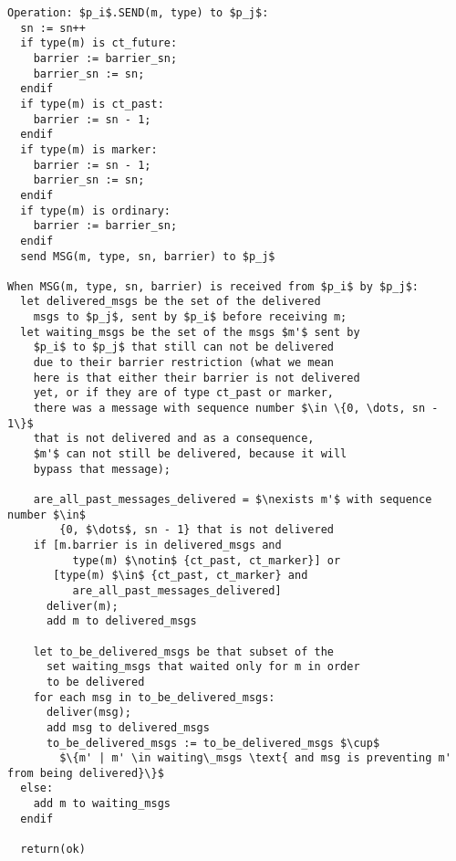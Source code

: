 \documentclass[12pt]{article}
\theoremstyle{plain}
\begin{document}
\clearpage

\begin{lstlisting}[frame=single]
Operation: $p_i$.SEND(m, type) to $p_j$:
  sn := sn++
  if type(m) is ct_future:
    barrier := barrier_sn;
    barrier_sn := sn;
  endif
  if type(m) is ct_past:
    barrier := sn - 1;
  endif
  if type(m) is marker:
    barrier := sn - 1;
    barrier_sn := sn;
  endif
  if type(m) is ordinary:
    barrier := barrier_sn;
  endif
  send MSG(m, type, sn, barrier) to $p_j$

When MSG(m, type, sn, barrier) is received from $p_i$ by $p_j$:
  let delivered_msgs be the set of the delivered 
    msgs to $p_j$, sent by $p_i$ before receiving m;
  let waiting_msgs be the set of the msgs $m'$ sent by
    $p_i$ to $p_j$ that still can not be delivered
    due to their barrier restriction (what we mean
    here is that either their barrier is not delivered
    yet, or if they are of type ct_past or marker,
    there was a message with sequence number $\in \{0, \dots, sn - 1\}$
    that is not delivered and as a consequence, 
    $m'$ can not still be delivered, because it will 
    bypass that message);
    
    are_all_past_messages_delivered = $\nexists m'$ with sequence number $\in$ 
        {0, $\dots$, sn - 1} that is not delivered
    if [m.barrier is in delivered_msgs and
          type(m) $\notin$ {ct_past, ct_marker}] or
       [type(m) $\in$ {ct_past, ct_marker} and
          are_all_past_messages_delivered]
      deliver(m);
      add m to delivered_msgs

    let to_be_delivered_msgs be that subset of the
      set waiting_msgs that waited only for m in order
      to be delivered 
    for each msg in to_be_delivered_msgs:
      deliver(msg);
      add msg to delivered_msgs
      to_be_delivered_msgs := to_be_delivered_msgs $\cup$
        $\{m' | m' \in waiting\_msgs \text{ and msg is preventing m' from being delivered}\}$
  else:
    add m to waiting_msgs
  endif

  return(ok)
 
\end{lstlisting}
\end{document}
